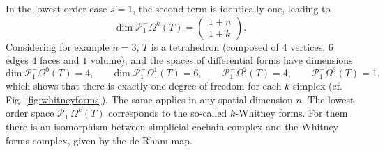 \documentclass{elsarticle}
\begin{document}
In the lowest order case $s=1$, the second term is identically one, leading to 
\begin{equation*}
    \mathrm{dim}\; \mathcal{P}^-_1\Omega^k(T)=\begin{pmatrix}
1+n \\
1+k
\end{pmatrix}.
\end{equation*}
Considering for example $n=3$, $T$ is a tetrahedron (composed of $4$ vertices, $6$ edges $4$ faces and $1$ volume), and the spaces of differential forms have dimensions
\begin{equation*}
   \mathrm{dim}\; \mathcal{P}^-_1\Omega^0(T)= 4, \qquad \mathrm{dim}\; \mathcal{P}^-_1\Omega^1(T)= 6, \qquad \mathcal{P}^-_1\Omega^2(T)= 4, \qquad \mathcal{P}^-_1\Omega^3(T)= 1,
\end{equation*}
which shows that there is exactly one degree of freedom for each $k$-simplex (cf. Fig. \ref{fig:whitneyforms}). The same applies in any spatial dimension $n$. The lowest order space $\mathcal{P}^-_1\Omega^k(T)$ corresponds to the so-called $k$-Whitney forms. For them there is an isomorphism between simplicial cochain complex and the Whitney forms complex, given by the de Rham map. 
\end{document}
